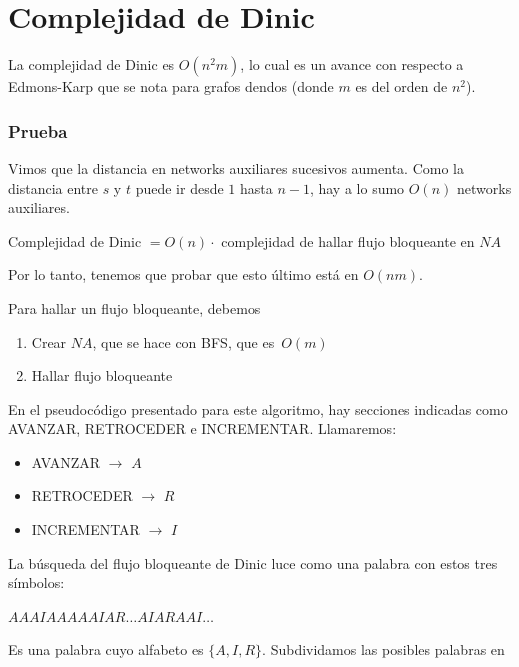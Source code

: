 \documentclass[10pt,a4paper]{article}
\begin{document}
\section*{Complejidad de Dinic}

La complejidad de Dinic es $O(n^2m)$, lo cual es un avance con respecto a Edmons-Karp que se nota para grafos dendos (donde $m$ es del orden de $n^2$).

\subsubsection*{Prueba}

Vimos que la distancia en networks auxiliares sucesivos aumenta. Como la distancia entre $s$ y $t$ puede ir desde $1$ hasta $n -1$, hay a lo sumo $O(n)$ networks auxiliares.

\begin{center}
Complejidad de Dinic $= O(n)\cdot $ complejidad de hallar flujo bloqueante en $NA$
\end{center}

Por lo tanto, tenemos que probar que esto último está en $O(nm)$.

Para hallar un flujo bloqueante, debemos

\begin{enumerate}

	\item Crear $NA$, que se hace con BFS, que es $O(m)$
	\item Hallar flujo bloqueante
\end{enumerate}

En el pseudocódigo presentado para este algoritmo, hay secciones indicadas como AVANZAR, RETROCEDER e INCREMENTAR. Llamaremos:

\begin{itemize}

	\item AVANZAR $\rightarrow$ $A$
	\item RETROCEDER $\rightarrow$ $R$
	\item INCREMENTAR $\rightarrow$ $I$
\end{itemize}

La búsqueda del flujo bloqueante de Dinic luce como una palabra con estos tres símbolos:

\begin{center}
$AAAIAAAAAIAR\dots AIARAAI\dots$
\end{center}

Es una palabra cuyo alfabeto es $\{A, I, R\}$. Subdividamos las posibles palabras en
\end{document}
